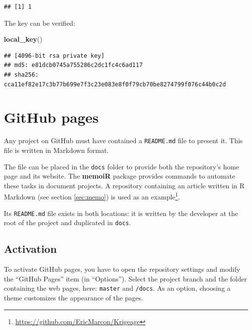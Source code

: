 \documentclass[
  12pt,
  american,
  a4paper,
  extrafontsizes,onecolumn,openright
  ]{memoir}
\newenvironment{Shaded}{\begin{snugshade}}{\end{snugshade}}
\newcommand{\FunctionTok}[1]{\textcolor[rgb]{0.13,0.29,0.53}{\textbf{#1}}}
\newcommand{\NormalTok}[1]{#1}
\begin{document}
\begin{verbatim}
## [1] 1
\end{verbatim}

\normalsize

The key can be verified:

\scriptsize

\begin{Shaded}
\begin{Highlighting}[]
\FunctionTok{local\_key}\NormalTok{()}
\end{Highlighting}
\end{Shaded}

\begin{verbatim}
## [4096-bit rsa private key]
## md5: e81dcb0745a755286c2dc1fc4c6ad117
## sha256: cca11ef82e17c3b77b699e7f3c23e083e8f0f79cb70be8274799f076c44b0c2d
\end{verbatim}

\normalsize

\section{GitHub pages}\label{sec:github-pages}

Any project on GitHub must have contained a \texttt{README.md} file to present it.
This file is written in Markdown format.

The file can be placed in the \texttt{docs} folder to provide both the repository's home page and its website.
The \textbf{memoiR} package provides commands to automate these tasks in document projects.
A repository containing an article written in R Markdown (see section \ref{sec:memo}) is used as an example\footnote{\url{https://github.com/EricMarcon/Krigeage}}.

Its \texttt{README.md} file exists in both locations: it is written by the developer at the root of the project and duplicated in \texttt{docs}.

\subsection{Activation}\label{activation}

To activate GitHub pages, you have to open the repository settings and modify the \enquote{GitHub Pages} item (in \enquote{Options}).
Select the project branch and the folder containing the web pages, here: \texttt{master} and \texttt{/docs}.
As an option, choosing a theme customizes the appearance of the pages.
\end{document}
